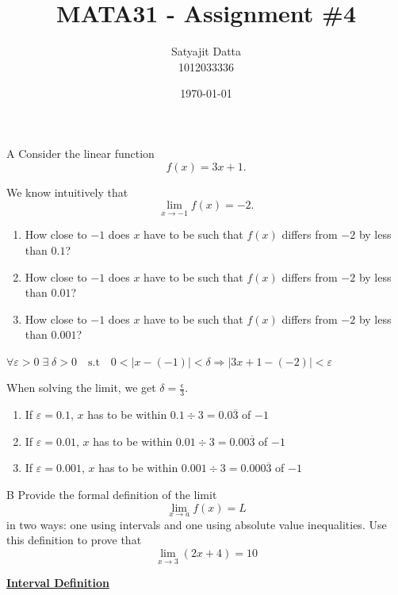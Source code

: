 \documentclass[]{article}
\title{\textbf{MATA31 - Assignment \#4}}
\author{ Satyajit Datta \\ 1012033336}
\date{\today}
\begin{document}
\maketitle

\begin{question}{A}
Consider the linear function
\[
f(x) = 3x + 1.
\]

We know intuitively that
\[
\lim_{x \to -1} f(x) = -2.
\]

\begin{enumerate}[label=\textbf{\Alph*.}]
    \item How close to $-1$ does $x$ have to be such that $f(x)$ differs from $-2$
    by less than $0.1$?
    \item How close to $-1$ does $x$ have to be such that $f(x)$ differs from $-2$
    by less than $0.01$?
    \item How close to $-1$ does $x$ have to be such that $f(x)$ differs from $-2$
    by less than $0.001$?
\end{enumerate}
\end{question}

\begin{center}
    $\forall \varepsilon > 0\;\exists\; \delta>0 \quad \text{s.t} \quad 
    0 < |x-(-1)| < \delta \Longrightarrow |3x+1 - (-2)|  < \varepsilon$
\end{center}

When solving the limit, we get $\delta = \frac{\epsilon}{3}$.

\begin{enumerate}[label=\textbf{\Alph*.}]
    \item If $\varepsilon = 0.1$, $x$ has to be within $0.1 \div 3 = 0.0\overline{3}$ of $-1$
    \item If $\varepsilon = 0.01$, $x$ has to be within $0.01 \div 3 = 0.00\overline{3}$ of $-1$
    \item If $\varepsilon = 0.001$, $x$ has to be within $0.001 \div 3 = 0.000\overline{3}$ of $-1$
\end{enumerate}

\begin{question}{B}
    Provide the formal definition of the limit
    \[
    \lim_{x \to a} f(x) = L
    \]
    in two ways: one using intervals and one using absolute value inequalities. Use this definition to prove that
    \[
    \lim_{x \to 3} (2x+4) = 10
    \]
\end{question}

\underline{\bf{Interval Definition}}
\end{document}
